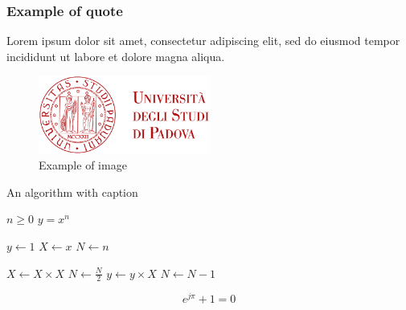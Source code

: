

\subsubsection{Example of quote}
\begin{displayquote}
Lorem ipsum dolor sit amet, consectetur adipiscing elit, sed do eiusmod tempor incididunt ut labore et dolore magna aliqua.
\end{displayquote}




\begin{figure}[ht]
    \centering
    \includegraphics[width=0.5\textwidth]{res/ltunipd}
    \caption{Example of image}
\end{figure}




\begin{algorithm}[ht]
    \caption{An algorithm with caption}\label{alg:two}
    \begin{algorithmic}
        \REQUIRE $n \geq 0$
        \ENSURE $y = x^n$
        
        \STATE $y \gets 1$
        \STATE $X \gets x$
        \STATE $N \gets n$
        
              \STATE $X \gets X \times X$
              \STATE $N \gets \frac{N}{2} $  
              \STATE $y \gets y \times X$
              \STATE $N \gets N - 1$
            \ENDIF
        \ENDWHILE
    \end{algorithmic}
\end{algorithm}




\begin{equation}
e^{j\pi} + 1 = 0
\end{equation}






